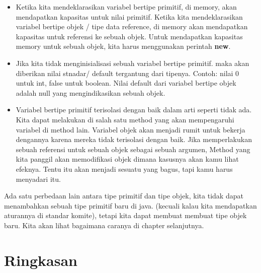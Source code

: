 \begin{itemize}
\item Ketika kita mendeklarasikan variabel bertipe primitif, di memory, akan mendapatkan kapasitas untuk nilai primitif. Ketika kita mendeklarasikan variabel bertipe objek / tipe data reference, di memory akan mendapatkan kapasitas untuk referensi ke sebuah objek. Untuk mendapatkan kapasitas memory untuk sebuah objek, kita harus menggunakan perintah \textbf{new}.
\item Jika kita tidak menginisialisasi sebuah variabel bertipe primitif. maka akan diberikan nilai stnadar/ default tergantung dari tipenya. Contoh: nilai 0 untuk int, false untuk boolean. Nilai default dari variabel bertipe objek adalah null yang mengindikasikan sebuah objek.
\item Variabel bertipe primitif terisolasi dengan baik dalam arti seperti tidak ada. Kita dapat melakukan di salah satu method yang akan mempengaruhi variabel di method lain. Variabel objek akan menjadi rumit untuk bekerja dengannya karena mereka tidak terisolasi dengan baik. Jika memperlakukan sebuah referensi untuk sebuah objek sebagai sebuah argumen, Method yang kita panggil akan memodifikasi objek dimana kasusnya akan kamu lihat efeknya. Tentu itu akan menjadi sesuatu yang bagus, tapi kamu harus menyadari itu.
\end{itemize}
Ada satu perbedaan lain antara tipe primitif dan tipe objek, kita tidak dapat menambahkan sebuah tipe primitif baru di java. (kecuali kalau kita mendapatkan aturannya di standar komite), tetapi kita dapat membuat membuat tipe objek baru. Kita akan lihat bagaimana caranya di chapter selanjutnya.

\section{Ringkasan}

